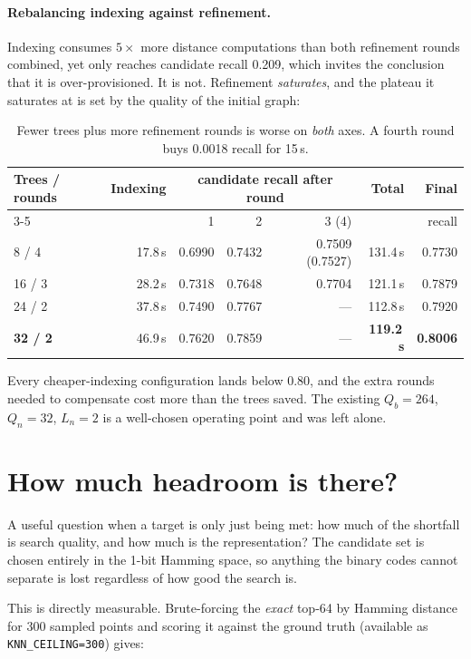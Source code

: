 \documentclass[11pt,a4paper]{article}
\newcommand{\code}[1]{\texttt{\small #1}}
\begin{document}
\paragraph{Rebalancing indexing against refinement.} Indexing consumes $5\times$
more distance computations than both refinement rounds combined, yet only
reaches candidate recall 0.209, which invites the conclusion that it is
over-provisioned. It is not. Refinement \emph{saturates}, and the plateau it
saturates at is set by the quality of the initial graph:

\begin{table}[h]
\centering
\begin{tabular}{lrrrrrr}
\toprule
Trees / rounds & Indexing & \multicolumn{3}{c}{candidate recall after round} & Total & Final \\
\cmidrule(lr){3-5}
 & & 1 & 2 & 3 (4) & & recall \\
\midrule
 8 / 4 & 17.8\,s & 0.6990 & 0.7432 & 0.7509 (0.7527) & 131.4\,s & 0.7730 \\
16 / 3 & 28.2\,s & 0.7318 & 0.7648 & 0.7704          & 121.1\,s & 0.7879 \\
24 / 2 & 37.8\,s & 0.7490 & 0.7767 & ---             & 112.8\,s & 0.7920 \\
\textbf{32 / 2} & 46.9\,s & 0.7620 & 0.7859 & ---    & \textbf{119.2\,s} & \textbf{0.8006} \\
\bottomrule
\end{tabular}
\caption{Fewer trees plus more refinement rounds is worse on \emph{both} axes.
A fourth round buys 0.0018 recall for 15\,s.}
\end{table}

\noindent
Every cheaper-indexing configuration lands below 0.80, and the extra rounds
needed to compensate cost more than the trees saved. The existing
$Q_b = 264$, $Q_n = 32$, $L_n = 2$ is a well-chosen operating point and was left
alone.

\section{How much headroom is there?}

A useful question when a target is only just being met: how much of the shortfall
is search quality, and how much is the representation? The candidate set is
chosen entirely in the 1-bit Hamming space, so anything the binary codes cannot
separate is lost regardless of how good the search is.

This is directly measurable. Brute-forcing the \emph{exact} top-64 by Hamming
distance for 300 sampled points and scoring it against the ground truth
(available as \code{KNN\_CEILING=300}) gives:
\end{document}
